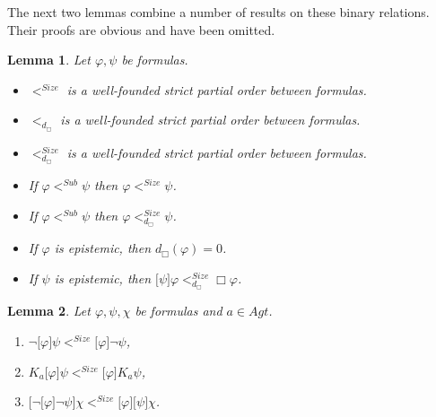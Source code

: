 \documentclass{article}[12pt]
\newtheorem{lemma}{Lemma}
\renewcommand{\phi}{\varphi}
\begin{document}
The next two lemmas combine a number of results on these binary relations.
Their proofs are obvious and have been omitted.
\begin{lemma} \label{gather.lemma} Let $\phi,\psi$ be formulas.
\begin{itemize}
\item \label{lem_1b}
$<^{Size}$ is a well-founded strict partial order between formulas.
\item \label{lem_1c}
$<_{d_{\Box}}$ is a well-founded strict partial order between formulas.
\item \label{lem_1}
$<_{d_{\Box}}^{Size}$ is a well-founded strict partial order between formulas.
\item \label{lem_1bh}
If $\phi <^{Sub} \psi$ then $\phi <^{Size} \psi$.
\item \label{lem_hans} If $\phi <^{Sub} \psi$ then $\phi <^{Size}_{d_{\Box}} \psi$.
\item \label{lem_1a}
If $\phi$ is epistemic, then $d_{\Box}(\phi)=0$.
\item If $\psi$ is epistemic, then $\lbrack\psi\rbrack\phi<_{d_{\Box}}^{Size}\Box\phi$.
\end{itemize}
\end{lemma}





\begin{lemma}\label{lem_2}
Let $\phi,\psi,\chi$ be formulas and $a\in Agt$.
\begin{enumerate}
\item $\neg\lbrack\phi\rbrack\psi<^{Size}\lbrack\phi\rbrack\neg\psi$,
\item $K_{a}\lbrack\phi\rbrack\psi<^{Size}\lbrack\phi\rbrack K_{a}\psi$,
\item $\lbrack\neg\lbrack\phi\rbrack\neg\psi\rbrack\chi<^{Size}\lbrack\phi\rbrack\lbrack\psi\rbrack\chi$.
\end{enumerate}
\end{lemma}
\end{document}
